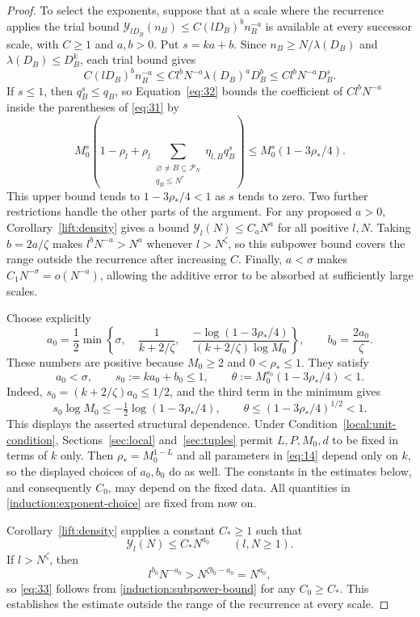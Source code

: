 \begin{proof}
To select the exponents, suppose that at a scale where the recurrence applies
the trial bound
$\mathcal Y_{lD_B}(n_B)\le C(lD_B)^b n_B^{-a}$ is available at every
successor scale, with $C\ge1$ and $a,b>0$.  Put $s=ka+b$.  Since
$n_B\ge N/\lambda(D_B)$ and $\lambda(D_B)\le D_B^k$, each trial bound gives
\[
 C(lD_B)^b n_B^{-a}
 \le C l^bN^{-a}\lambda(D_B)^aD_B^b
 \le C l^bN^{-a}D_B^s.
\]
If $s\le1$, then $q_B^s\le q_B$, so Equation~\eqref{eq:32} bounds the
coefficient of $C l^bN^{-a}$ inside the
parentheses of \eqref{eq:31} by
\[
 M_0^s\left(1-\rho_l+
   \rho_l\sum_{\substack{\varnothing\ne B\subseteq\mathcal P_N\\q_B\le N^\tau}}
      \eta_{l,B}q_B^s\right)
 \le M_0^s(1-3\rho_*/4).
\]
This upper bound tends to $1-3\rho_*/4<1$ as $s$ tends to zero.  Two
further restrictions handle the other parts of the argument.
For any proposed $a>0$, Corollary~\ref{lift:density} gives a bound
$\mathcal Y_l(N)\le C_aN^a$ for all positive $l,N$.  Taking
$b=2a/\zeta$ makes $l^bN^{-a}>N^a$ whenever $l>N^\zeta$, so this
subpower bound covers the range outside the recurrence after increasing
$C$.  Finally, $a<\sigma$ makes $C_1N^{-\sigma}=o(N^{-a})$, allowing
the additive error to be absorbed at sufficiently large scales.

Choose explicitly
\[
 a_0=\frac12\min\left\{
   \sigma,\quad \frac1{k+2/\zeta},\quad
   \frac{-\log(1-3\rho_*/4)}{(k+2/\zeta)\log M_0}
 \right\},
 \qquad b_0=\frac{2a_0}{\zeta}.
\]
These numbers are positive because $M_0\ge2$ and $0<\rho_*\le1$.
They satisfy
\begin{equation}
 a_0<\sigma,\qquad
 s_0:=ka_0+b_0\le1,\qquad
 \theta:=M_0^{s_0}(1-3\rho_*/4)<1.
 \label{induction:exponent-choice}
\end{equation}
Indeed, $s_0=(k+2/\zeta)a_0\le1/2$, and the third term in the minimum gives
\[
 s_0\log M_0\le-\tfrac12\log(1-3\rho_*/4),
 \qquad
 \theta\le(1-3\rho_*/4)^{1/2}<1.
\]
This displays the asserted structural dependence.  Under
Condition~\eqref{local:unit-condition}, Sections~\ref{sec:local}
and~\ref{sec:tuples} permit $L,P,M_0,d$ to be fixed in terms of $k$ only.
Then $\rho_*=M_0^{1-L}$ and all parameters in \eqref{eq:14} depend only
on $k$, so the displayed choices of $a_0,b_0$ do as well.  The constants
in the estimates below, and consequently $C_0$, may depend on the fixed data.
All quantities in \eqref{induction:exponent-choice} are fixed from now on.

Corollary~\ref{lift:density} supplies a constant
$C_*\ge1$ such that
\begin{equation}
 \mathcal Y_l(N)\le C_*N^{a_0}
 \qquad(l,N\ge1).
 \label{induction:subpower-bound}
\end{equation}
If $l>N^\zeta$, then
\[
 l^{b_0}N^{-a_0}>N^{\zeta b_0-a_0}=N^{a_0},
\]
so \eqref{eq:33} follows from \eqref{induction:subpower-bound} for any
$C_0\ge C_*$.  This establishes the estimate outside the range of
the recurrence at every scale.


\end{proof}

